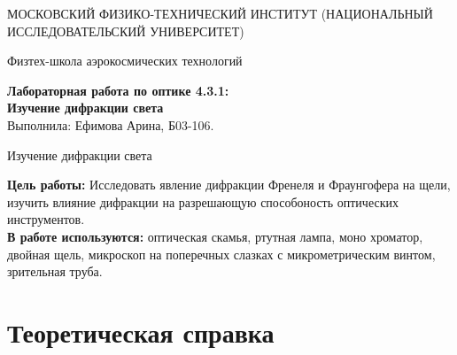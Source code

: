 \documentclass[a4paper,12pt]{article} %
\begin{document}
\begin{titlepage}
\begin{center}
    {\large МОСКОВСКИЙ ФИЗИКО-ТЕХНИЧЕСКИЙ ИНСТИТУТ (НАЦИОНАЛЬНЫЙ ИССЛЕДОВАТЕЛЬСКИЙ УНИВЕРСИТЕТ)}
\end{center}

\begin{center}
    {\large Физтех-школа аэрокосмических технологий}
\end{center}
	\hfill \break
	\hfill\break
	\hfill\break
	\hfill \break
	\hfill \break
	\hfill \break
	\hfill \break
	\hfill \break
	\hfill \break
\begin{center}
    {\bf Лабораторная работа по оптике 4.3.1:}\\
    {\bf Изучение дифракции света}\\
    Выполнила: Ефимова Арина, Б03-106.
\end{center}
\end{titlepage}

\begin{center}
    {\large Изучение дифракции света}
\end{center}

\textbf{Цель работы:} Исследовать явление дифракции Френеля и Фраунгофера на щели, изучить влияние дифракции на разрешающую способоность оптических инструментов. \\

\textbf{В работе используются:} оптическая скамья, ртутная лампа, моно хроматор, двойная щель, микроскоп на поперечных слазках с микрометрическим винтом, зрительная труба.\\




\section{Теоретическая справка}
\end{document}
